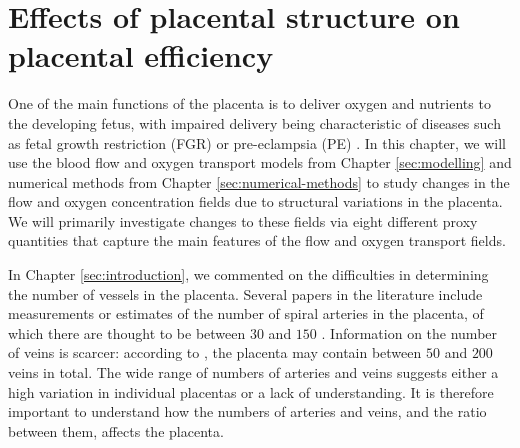 \chapter{Effects of placental structure on placental efficiency} \label{sec:nutrient-uptake}
    
    One of the main functions of the placenta is to deliver oxygen and nutrients to the developing fetus, with impaired delivery being characteristic of diseases such as fetal growth restriction (FGR) or pre-eclampsia (PE) \cite{jensenBloodFlowTransport2019,burtonRheologicalPhysiologicalConsequences2009,burtonPathophysiologyPlacentalderivedFetal2018,dellschaftHaemodynamicsHumanPlacenta2020,serovOptimalVilliDensity2015}. In this chapter, we will use the blood flow and oxygen transport models from Chapter \ref{sec:modelling} and numerical methods from Chapter \ref{sec:numerical-methods} to study changes in the flow and oxygen concentration fields due to structural variations in the placenta. We will primarily investigate changes to these fields via eight different proxy quantities that capture the main features of the flow and oxygen transport fields.
    
    In Chapter \ref{sec:introduction}, we commented on the difficulties in determining the number of vessels in the placenta. Several papers in the literature include measurements or estimates of the number of spiral arteries in the placenta, of which there are thought to be between $30$ and $150$ \cite{benirschkePathologyHumanPlacenta2012,chernyavskyMathematicalModelIntervillous2010,kaufmannPlacentalVascularizationBlood1988}. Information on the number of veins is scarcer: according to \citeauthor{chernyavskyMathematicalModelIntervillous2010} \cite{chernyavskyMathematicalModelIntervillous2010}, the placenta may contain between $50$ and $200$ veins in total. The wide range of numbers of arteries and veins suggests either a high variation in individual placentas or a lack of understanding. It is therefore important to understand how the numbers of arteries and veins, and the ratio between them, affects the placenta.
    

